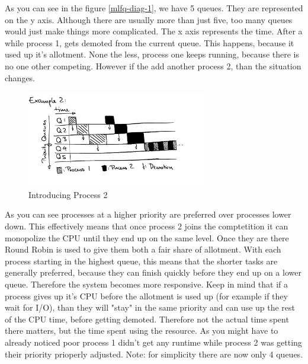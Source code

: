 \documentclass{report}
\begin{document}
As you can see in the figure \ref{mlfq-diag-1}, we have 5 queues. They are represented on the y axis. 
Although there are usually more than just five, too many queues would just make things more complicated. 
The x axis represents the time.
After a while process 1, gets demoted from the current queue. This happens, because it used up it's allotment.
None the less, process one keeps running, because there is no one other competing. 
However if the add another process 2, than the situation changes.

\begin{figure}[h]
  \begin{center}
    \includegraphics[width=0.7\textwidth]{assets/mlfq-diag-2.png}
    \caption{Introducing Process 2}
    \label{mlfq-diag-2}
  \end{center}
\end{figure}

As you can see processes at a higher priority are preferred over processes lower down. 
This effectively means that once process 2 joins the comptetition it can monopolize the CPU until they end up on the same level.
Once they are there Round Robin is used to give them both a fair share of allotment.
With each process starting in the highest queue, this means that the shorter tasks are generally preferred, because they can finish quickly before they end up on a lower queue. Therefore the system becomes more responsive.
Keep in mind that if a process gives up it's CPU before the allotment is used up (for example if they wait for I/O), than they will "stay" in the same priority and can use up the rest of the CPU time, before getting demoted.
Therefore not the actual time spent there matters, but the time spent using the resource.
As you might have to already noticed poor process 1 didn't get any runtime while process 2 was getting their priority prioperly adjusted. Note: for simplicity there are now only 4 queues.
\end{document}
